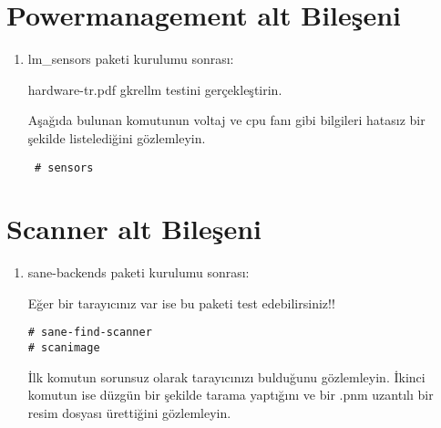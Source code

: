 \documentclass[a4paper,10pt]{article}
\begin{document}
\section{Powermanagement alt Bileşeni}
\begin{enumerate}
 \item lm\_sensors paketi kurulumu sonrası:

hardware-tr.pdf gkrellm testini gerçekleştirin.

Aşağıda bulunan komutunun voltaj ve cpu fanı gibi bilgileri hatasız bir şekilde listelediğini gözlemleyin.
\begin{verbatim}
 # sensors 
\end{verbatim}

\end{enumerate}

\section{Scanner alt Bileşeni}
\begin{enumerate}
\item sane-backends paketi kurulumu sonrası:

Eğer bir tarayıcınız var ise bu paketi test edebilirsiniz!!
\begin{verbatim}
# sane-find-scanner
# scanimage 
\end{verbatim}

İlk komutun sorunsuz olarak tarayıcınızı bulduğunu gözlemleyin.
İkinci komutun ise düzgün bir şekilde tarama yaptığını ve bir .pnm uzantılı bir resim dosyası ürettiğini gözlemleyin.
\end{enumerate}
\end{document}

